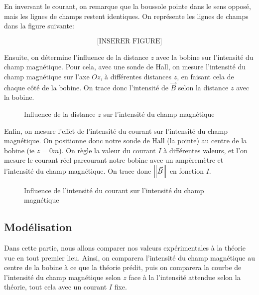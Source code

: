\documentclass[12pt]{article}
\begin{document}
En inversant le courant, on remarque que la boussole pointe dans le sens opposé, mais les lignes de champs restent identiques. On représente
les lignes de champs dans la figure suivante:

\begin{equation}
    \text{[INSERER FIGURE]}
\end{equation}

Ensuite, on détermine l'influence de la distance $z$ avec la bobine sur l'intensité du champ magnétique. Pour cela, avec une sonde de Hall, on mesure l'intensité 
du champ magnétique sur l'axe $Oz$, à différentes distances $z$, en faisant cela de chaque côté de la bobine.
On trace donc l'intensité de $\vec{B}$ selon la distance $z$ avec la bobine. 

\begin{figure}[h!]
    \begin{center}
    \end{center}
    \caption{Influence de la distance $z$ sur l'intensité du champ magnétique}
\end{figure}

Enfin, on mesure l'effet de l'intensité du courant sur l'intensité du champ magnétique. On positionne donc notre
sonde de Hall (la pointe) au centre de la bobine (ie $z=0m$). On règle la valeur du courant $I$ à différentes valeurs, et l'on mesure 
le courant réel parcourant notre bobine avec un ampèremètre et l'intensité du champ magnétique. On trace donc $\norm{\vec{B}}$ en fonction $I$.

\begin{figure}[h!]
    \begin{center}
    \end{center}
    \caption{Influence de l'intensité du courant sur l'intensité du champ magnétique}
\end{figure}

\newpage

\subsection{Modélisation}
Dans cette partie, nous allons comparer nos valeurs expérimentales à la théorie vue en tout premier lieu. Ainsi,
on comparera l'intensité du champ magnétique au centre de la bobine à ce que la théorie prédit, puis on comparera la courbe
de l'intensité du champ magnétique selon $z$ face à la l'intensité attendue selon la théorie, tout cela avec un courant $I$ fixe.

\newpage
\end{document}
